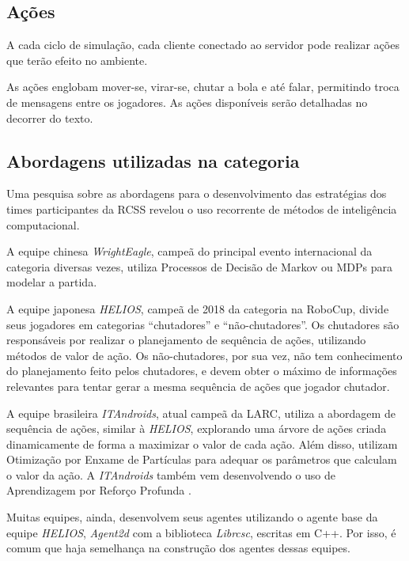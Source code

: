 \subsection{Ações}
\label{sec:actions}

A cada ciclo de simulação, cada cliente conectado ao servidor pode realizar ações que terão efeito no ambiente.\cite{rcssmanual2003}

As ações englobam mover-se, virar-se, chutar a bola e até falar, permitindo troca de mensagens entre os jogadores. As ações disponíveis serão detalhadas no decorrer do texto.


\subsection{Abordagens utilizadas na categoria}
\par Uma pesquisa sobre as abordagens para o desenvolvimento das estratégias dos times participantes da RCSS revelou o uso recorrente de métodos de inteligência computacional.
\par A equipe chinesa \textit{WrightEagle}, campeã do principal evento internacional da categoria diversas vezes, utiliza Processos de Decisão de Markov ou MDPs para modelar a partida\cite{bai2015online}.
\par A equipe japonesa \textit{HELIOS}, campeã de 2018 da categoria na RoboCup, divide seus jogadores em categorias ``chutadores'' e ``não-chutadores''.
Os chutadores são responsáveis por realizar o planejamento de sequência de ações, utilizando métodos de valor de ação.
Os não-chutadores, por sua vez, não tem conhecimento do planejamento feito pelos chutadores, e devem obter o máximo de informações relevantes para tentar gerar a mesma sequência de ações que jogador chutador\cite{nakashima2018helios2018}.
\par A equipe brasileira \textit{ITAndroids}, atual campeã da LARC, utiliza a abordagem de sequência de ações, similar à \textit{HELIOS}, explorando uma árvore de ações criada dinamicamente de forma a maximizar o valor de cada ação. Além disso, utilizam Otimização por Enxame de Partículas \cite{melloitandroids} para adequar os parâmetros que calculam o valor da ação. A \textit{ITAndroids} também vem desenvolvendo o uso de Aprendizagem por Reforço Profunda \cite{maximoitandroids}.
\par Muitas equipes, ainda, desenvolvem seus agentes utilizando o agente base da equipe \textit{HELIOS}, \textit{Agent2d} com a biblioteca \textit{Librcsc}, escritas em C++. Por isso, é comum que haja semelhança na construção dos agentes dessas equipes.

